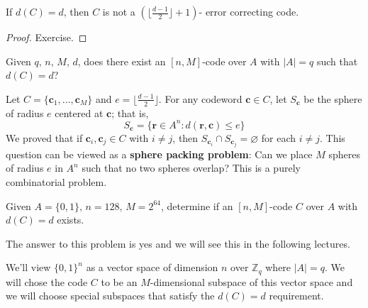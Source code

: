 \begin{thmbox}
    \begin{theorem}
        If $ d(C)=d $, then $ C $ is not a $ \left( \lfloor \frac{d-1}{2}\rfloor +1 \right) $-
        error correcting code.
    \end{theorem} \end{thmbox}

\begin{proof}
    Exercise.
\end{proof}

Given $ q,\,n,\,M,\,d $, does there exist an $ [n,M] $-code over $ A $
with $ |A|=q $ such that $ d(C)=d $?

Let $ C=\{\bm{c}_1,\ldots ,\bm{c}_M\} $ and $ e=\lfloor \frac{d-1}{2} \rfloor $.
For any codeword $ \bm{c}\in C $, let $ S_{\bm{c}} $ be the sphere of radius $ e $ centered at
$ \bm{c} $;
that is,
\[ S_{\bm{c}}= \{\bm{r}\in A^n:d(\bm{r},\bm{c})\leqslant e\} \]
We proved that if $ \bm{c}_i,\bm{c}_j\in C $ with $ i\neq j $,
then $ S_{\bm{c}_i}\cap S_{\bm{c}_j}= \varnothing $ for each $ i\neq j $.
This question can be viewed as a \textbf{sphere packing problem}:
Can we place $ M $ spheres of radius $ e $ in $ A^n $ such that
no two spheres overlap? This is a purely combinatorial problem.

Given $ A=\{0,1\},\,n=128,\,M=2^{64} $, determine
if an $ [n,M] $-code $ C $ over $ A $ with $ d(C)=d $ exists.

The answer to this problem is yes and we will see this in the following lectures.

 We'll view $ \{0,1\}^{n} $ as a vector space of
dimension $ n $ over $ \mathbb{Z}_q $ where $ |A|=q $. We will chose the code
$ C $ to be an $ M $-dimensional subspace of this vector space
and we will choose special subspaces that satisfy the $ d(C)=d $ requirement.